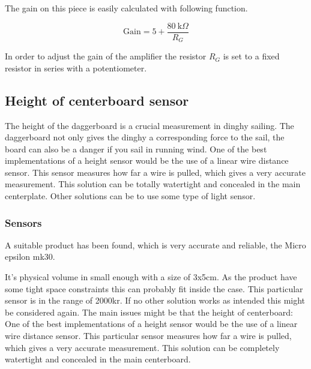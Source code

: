 The gain on this piece is easily calculated with following function.  

\begin{equation}%
\textrm{Gain} = 5 + \frac{80~\textrm{k}\Omega}{R_G}
\end{equation}

In order to adjust the gain of the amplifier the resistor $R_G$ is set to a fixed resistor in series with a potentiometer.


\subsection{Height of centerboard sensor}
The height of the daggerboard is a crucial measurement in dinghy sailing. The daggerboard not only gives the dinghy a corresponding force to the sail, the board can also be a danger if you sail in running wind. One of the best implementations of a height sensor would be the use of a linear wire distance sensor. This sensor measures how far a wire is pulled, which gives a very accurate measurement. This solution can be totally watertight and concealed in the main centerplate. Other solutions can be to use some type of light sensor. 

\subsubsection{Sensors}

A suitable product has been found, which is very accurate and reliable, the Micro epsilon mk30\cite{micro-epsilon-mk30}.

It's physical volume in small enough with a size of 3x5cm. As the product have some tight space constraints this can probably fit inside the case. This particular sensor is in the range of 2000kr. If no other solution works as intended this might be considered again.
The main issues might be that the height of centerboard: %
One of the best implementations of a height sensor would be the use of a linear wire distance sensor. This particular sensor measures how far a wire is pulled, which gives a very accurate measurement. This solution can be completely watertight and concealed in the main centerboard.  

